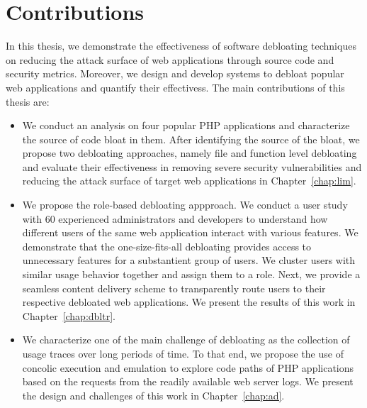\section{Contributions}

In this thesis, we demonstrate the effectiveness of software debloating techniques on reducing the attack surface of web applications through source code and security metrics. 
Moreover, we design and develop systems to debloat popular web applications and quantify their effectivess. The main contributions of this thesis are:

\begin{itemize}
    \item We conduct an analysis on four popular PHP applications and characterize the source of code bloat in them. After identifying the source of the bloat, we propose two debloating approaches, namely file and function level debloating and evaluate their effectiveness in removing severe security vulnerabilities and reducing the attack surface of target web applications in Chapter~\ref{chap:lim}.
    \item We propose the role-based debloating appproach. We conduct a user study with 60 experienced administrators and developers to understand how different users of the same web application interact with various features. We demonstrate that the one-size-fits-all debloating provides access to unnecessary features for a substantient group of users. We cluster users with similar usage behavior together and assign them to a role. Next, we provide a seamless content delivery scheme to transparently route users to their respective debloated web applications. We present the results of this work in Chapter~\ref{chap:dbltr}. 
    \item We characterize one of the main challenge of debloating as the collection of usage traces over long periods of time. To that end, we propose the use of concolic execution and emulation to explore code paths of PHP applications based on the requests from the readily available web server logs. We present the design and challenges of this work in Chapter~\ref{chap:ad}.
\end{itemize}